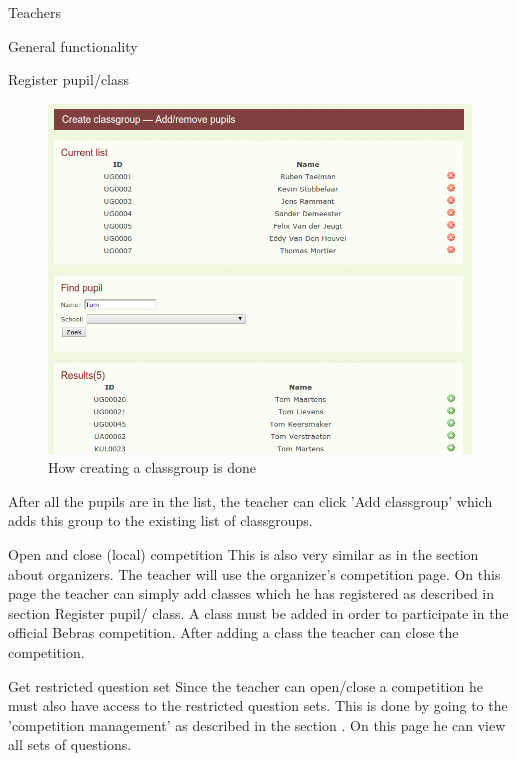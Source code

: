 \begin{section}{Teachers}
\begin{subsection}{General functionality}
\begin{subsubsection}{Register pupil/class}
\begin{figure}[!h]
                \includegraphics[width=1\textwidth]{formal/img/add_remove_pupil_classgroup.png}
                \caption{How creating a classgroup is done}
                \label{create_classgroup}
            \end{figure}
            After all the pupils are in the list, the teacher can click 'Add classgroup' which adds this group to the existing list
            of classgroups. 
        \end{subsubsection}
        \begin{subsubsection}{Open and close (local) competition}
            This is also very similar as in the section about organizers. The teacher will use the organizer's competition page.
            On this page the teacher can simply add classes which he has registered as described in section Register pupil/ class.
            A class must be added in order to participate in the official Bebras competition. After adding a class the teacher can
            close the competition.\\
        \end{subsubsection}
        \begin{subsubsection}{Get restricted question set}
            Since the teacher can open/close a competition he must also have access to the restricted question sets. This is done by going
            to the 'competition management' as described in the section . On this page he can view all sets of questions.
        \end{subsubsection}

\end{subsection}
\end{section}
